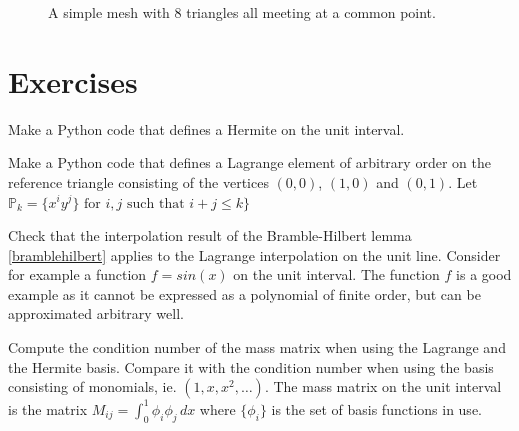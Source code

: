 \begin{figure}
\begin{center}
\caption{
A simple mesh with 8 triangles all meeting at a common point.}
\label{fig:Lagrange5}
\end{center}
\end{figure}




\section{Exercises}
\begin{exercise}
\label{hermite:interval}
Make a Python code that defines a Hermite on the unit interval.       
\end{exercise}



\begin{exercise}
\label{lagrange:triangle}
Make a Python code that defines a Lagrange element of arbitrary order on the reference triangle 
consisting of the vertices $(0,0)$, $(1,0)$ and $(0,1)$. Let $\mathbb{P}_k = \{ x^i y^j \} \mbox{ for } i,j \mbox{ such that } i+j \le k\} $     
\end{exercise}

\begin{exercise}
Check that the interpolation result
of the Bramble-Hilbert lemma \ref{bramblehilbert} applies to the Lagrange interpolation on the unit line. Consider 
for example a function $f = sin(x)$ on the unit interval. The function $f$ is a good example as it cannot be expressed 
as a polynomial of finite order, but can be approximated arbitrary well. 
\end{exercise}

\begin{exercise}
Compute the condition number of the mass matrix when using the Lagrange and the Hermite basis. Compare it with the condition
number when using the basis consisting of monomials, ie. $(1, x, x^2, \ldots)$.   
	The mass matrix on the unit interval  is the matrix $M_{ij} = \int_0^1 \phi_i \phi_j \, dx $ where $\{\phi_i\}$ is 
	the set of basis functions in use. 
\end{exercise}





